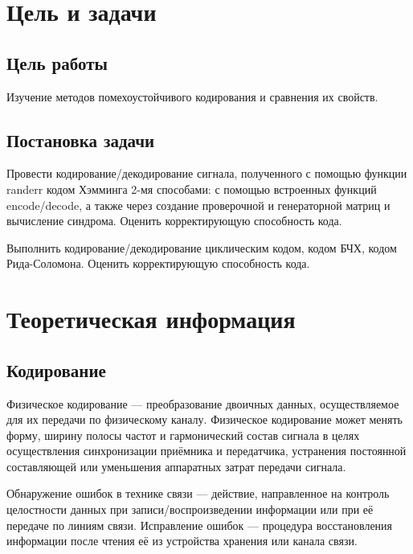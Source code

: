 

\setcounter{tocdepth}{3}






\section{Цель и задачи}

\subsection{Цель работы}
Изучение методов помехоустойчивого кодирования и сравнения их свойств.
 
\subsection{Постановка задачи}
Провести кодирование/декодирование сигнала, полученного с помощью функции randerr кодом Хэмминга 2-мя способами: с помощью встроенных функций encode/decode, а также через создание проверочной и генераторной матриц и вычисление синдрома. Оценить корректирующую способность кода.

Выполнить кодирование/декодирование циклическим кодом, кодом БЧХ, кодом Рида-Соломона. Оценить корректирующую способность кода.

 
\section{Теоретическая информация}

\subsection{Кодирование}
Физическое кодирование — преобразование двоичных данных, осуществляемое для их передачи по физическому каналу. Физическое кодирование может менять форму, ширину полосы частот и гармонический состав сигнала в целях осуществления синхронизации приёмника и передатчика, устранения постоянной составляющей или уменьшения аппаратных затрат передачи сигнала.

Обнаружение ошибок в технике связи — действие, направленное на контроль целостности данных при записи/воспроизведении информации или при её передаче по линиям связи. Исправление ошибок — процедура восстановления информации после чтения её из устройства хранения или канала связи.

